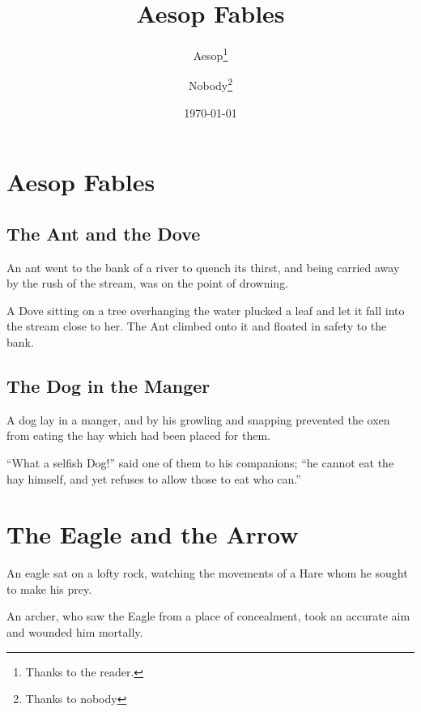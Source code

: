 \documentclass{report}
\title{Aesop Fables}
\author{Aesop\thanks{Thanks to the reader.}
       \and Nobody\thanks{Thanks to nobody}}
\date{\today}
\begin{document}
\maketitle
\tableofcontents
\chapter{Aesop Fables}
\section{The Ant and the Dove}

An ant went to the bank of a river to quench its thirst, and
being carried away by the rush of the stream, was on the
point of drowning.

A Dove sitting on a tree overhanging the water plucked a
leaf and let it fall into the stream close to her. The Ant
climbed onto it and floated in safety to the bank.

\section{The Dog in the Manger}

A dog lay in a manger, and by his growling and snapping
prevented the oxen from eating the hay which had been
placed for them.

``What a selfish Dog!'' said one of them to his companions;
``he cannot eat the hay himself, and yet refuses to allow
those to eat who can.''

\chapter{The Eagle and the Arrow}

An eagle sat on a lofty rock, watching the movements of a
Hare whom he sought to make his prey.

An archer, who saw the Eagle from a place of concealment,
took an accurate aim and wounded him mortally.
\end{document}
